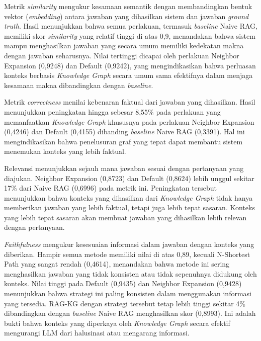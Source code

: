 Metrik \textit{similarity} mengukur kesamaan semantik dengan membandingkan bentuk vektor (\textit{embedding}) antara jawaban yang dihasilkan sistem dan jawaban \textit{ground truth}.
Hasil menunjukkan bahwa semua perlakuan, termasuk \textit{baseline} Naive RAG, memiliki skor \textit{similarity} yang relatif tinggi di atas 0,9, menandakan bahwa sistem mampu menghasilkan jawaban yang secara umum memiliki kedekatan makna dengan jawaban seharusnya.
Nilai tertinggi dicapai oleh perlakuan Neighbor Expansion (0,9248) dan Default (0,9242), yang mengindikasikan bahwa perluasan konteks berbasis \textit{Knowledge Graph} secara umum sama efektifnya dalam menjaga kesamaan makna dibandingkan dengan \textit{baseline}.

Metrik \textit{correctness} menilai kebenaran faktual dari jawaban yang dihasilkan.
Hasil menunjukkan peningkatan hingga sebesar 8,55\% pada perlakuan yang memanfaatkan \textit{Knowledge Graph} khususnya pada perlakuan Neighbor Expansion (0,4246) dan  Default (0,4155) dibanding \textit{baseline} Naive RAG (0,3391).
Hal ini mengindikasikan bahwa penelusuran graf yang tepat dapat membantu sistem menemukan konteks yang lebih faktual.

Relevansi menunjukkan sejauh mana jawaban sesuai dengan pertanyaan yang diajukan.
Neighbor Expansion (0,8723) dan Default (0,8624) lebih unggul sekitar 17\% dari Naive RAG (0,6996) pada metrik ini.
Peningkatan tersebut menunjukkan bahwa konteks yang dihasilkan dari \textit{Knowledge Graph} tidak hanya memberikan jawaban yang lebih faktual, tetapi juga lebih tepat sasaran.
Konteks yang lebih tepat sasaran akan membuat jawaban yang dihasilkan lebih relevan dengan pertanyaan.

\textit{Faithfulness} mengukur kesesuaian informasi dalam jawaban dengan konteks yang diberikan.
Hampir semua metode memiliki nilai di atas 0,89, kecuali N-Shortest Path yang sangat rendah (0,4614), menandakan bahwa metode ini sering menghasilkan jawaban yang tidak konsisten atau tidak sepenuhnya didukung oleh konteks.
Nilai tinggi pada Default (0,9435) dan Neighbor Expansion (0,9428) menunjukkan bahwa strategi ini paling konsisten dalam menggunakan informasi yang tersedia.
RAG-KG dengan strategi tersebut tetap lebih tinggi sekitar 4\% dibandingkan dengan \textit{baseline} Naive RAG menghasilkan skor (0,8993).
Ini adalah bukti bahwa konteks yang diperkaya oleh \textit{Knowledge Graph} secara efektif mengurangi LLM dari halusinasi atau mengarang informasi.

